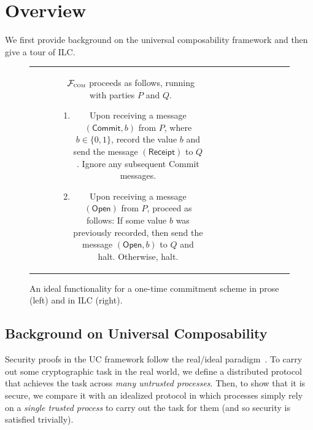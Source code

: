 \section{Overview}
\label{sec:overview}

We first provide background on the universal composability framework and then
give a tour of ILC.

\begin{figure}[t]
\centering
\begin{tabular}{c|c}
\begin{subfigure}{.575\textwidth}
    $\mathcal{{F}}_{\textsc{com}}$ proceeds as follows, running with parties $P$ and
  $Q$.
    \begin{enumerate}
        \item Upon receiving a message $(\mathsf{Commit}, b)$ from $P$, where $b
          \in \{ 0, 1 \}$, record the value $b$ and send the message
          $(\mathsf{Receipt})$ to $Q$. Ignore any subsequent \textsf{Commit}
          messages.
        \item Upon receiving a message $(\mathsf{Open})$ from $P$, proceed as
          follows: If some value $b$ was previously recorded, then send the
          message $(\mathsf{Open}, b)$ to $Q$ and halt. Otherwise, halt.
    \end{enumerate}
\label{func:com}
\end{subfigure}\hspace{0.02\textwidth}
&\hspace{0.02\textwidth}
\begin{subfigure}{.35\textwidth}
  
\end{subfigure}
\end{tabular}
\caption{An ideal functionality for a one-time commitment scheme in prose (left)
  and in ILC (right).}
\label{func:com}
\end{figure}

\subsection{Background on Universal Composability}
\label{subsec:background-uc}

Security proofs in the UC framework follow the real/ideal
paradigm~\cite{goldreich1987play}. To carry out some cryptographic task in the
real world, we define a distributed protocol that achieves the task across
\emph{many untrusted processes}. Then, to show that it is secure, we compare it
with an idealized protocol in which processes simply rely on a \emph{single
  trusted process} to carry out the task for them (and so security is satisfied
trivially).

